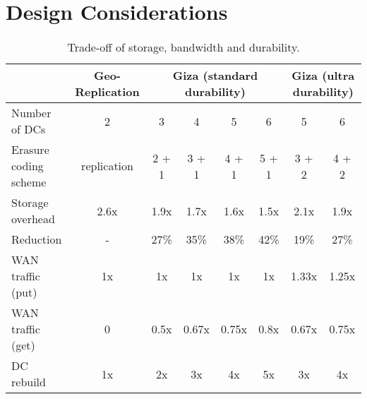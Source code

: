 \section{Design Considerations}
\label{sec:motivation}

%
%


\begin{table*}[tp]
\centering
\begin{tabular}{|l||c||c|c|c|c||c|c|}
\hline
				& Geo-Replication    	& \multicolumn{4}{c||}{Giza (standard durability)}		& \multicolumn{2}{c|}{Giza (ultra durability)}
\\ \hline \hline
Number of DCs 				& 2										& 3 & 4 & 5 & 6									& 5 & 6
\\ \hline
Erasure coding scheme & replication					& 2 + 1 & 3 + 1 & 4 + 1 & 5 + 1	& 3 + 2 & 4 + 2
\\ \hline \hline
Storage overhead			& 2.6x								& 1.9x & 1.7x & 1.6x & 1.5x			& 2.1x & 1.9x
\\ \hline
Reduction							& -										& 27\% & 35\% & 38\% & 42\%			& 19\% & 27\%
\\ \hline \hline
WAN traffic (put)			& 1x									& 1x & 1x & 1x & 1x 						& 1.33x & 1.25x
\\ \hline
WAN traffic (get)			& 0										& 0.5x & 0.67x & 0.75x & 0.8x		& 0.67x & 0.75x
\\ \hline
DC rebuild 						& 1x									& 2x & 3x & 4x & 5x 						& 3x & 4x
\\ \hline \hline
\end{tabular}
\caption{Trade-off of storage, bandwidth and durability.}
\label{tab:cost_benefit}
\end{table*}


